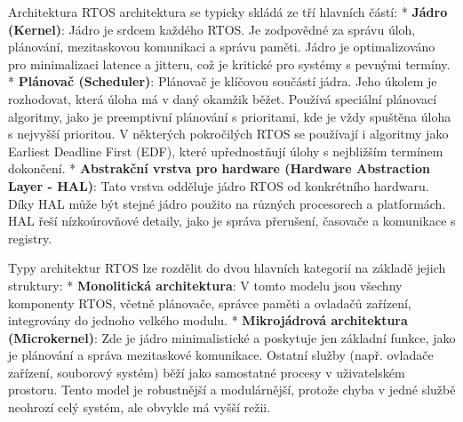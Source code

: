 \chap Architektura
RTOS architektura se typicky skládá ze tří hlavních částí:
\begitems
* {\bf Jádro (Kernel)}: Jádro je srdcem každého RTOS. Je zodpovědné za správu úloh, plánování, mezitaskovou komunikaci a správu paměti. Jádro je optimalizováno pro minimalizaci latence a jitteru, což je kritické pro systémy s pevnými termíny.
* {\bf Plánovač (Scheduler)}: Plánovač je klíčovou součástí jádra. Jeho úkolem je rozhodovat, která úloha má v daný okamžik běžet. Používá speciální plánovací algoritmy, jako je preemptivní plánování s prioritami, kde je vždy spuštěna úloha s nejvyšší prioritou. V některých pokročilých RTOS se používají i algoritmy jako Earliest Deadline First (EDF), které upřednostňují úlohy s nejbližším termínem dokončení.
* {\bf Abstrakční vrstva pro hardware (Hardware Abstraction Layer - HAL)}: Tato vrstva odděluje jádro RTOS od konkrétního hardwaru. Díky HAL může být stejné jádro použito na různých procesorech a platformách. HAL řeší nízkoúrovňové detaily, jako je správa přerušení, časovače a komunikace s registry.
\enditems

\sec Typy architektur
RTOS lze rozdělit do dvou hlavních kategorií na základě jejich struktury:
\begitems
* {\bf Monolitická architektura}: V tomto modelu jsou všechny komponenty RTOS, včet\-ně plánovače, správce paměti a ovladačů zařízení, integrovány do jednoho velkého modulu. 
* {\bf Mikrojádrová architektura (Microkernel)}: Zde je jádro minimalistické a poskytuje jen základní funkce, jako je plánování a správa mezitaskové komunikace. Ostatní služby (např. ovladače zařízení, souborový systém) běží jako samostatné procesy v uživatelském prostoru. Tento model je robustnější a modulárnější, protože chyba v jedné službě neohrozí celý systém, ale obvykle má vyšší režii.
\enditems
